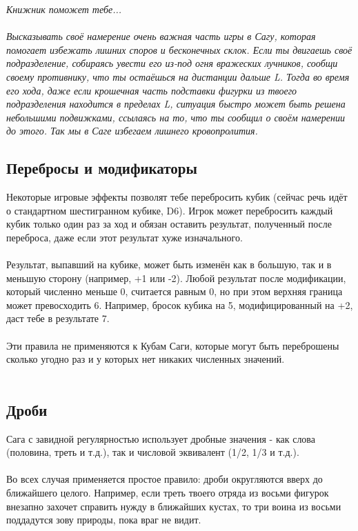 \documentclass[a4paper,11pt,twoside]{article}
\begin{document}
\begingroup
\fontsize{15pt}{11pt}\selectfont
\textit{Книжник поможет тебе...}\\ \\
\fontsize{11pt}{11pt}\selectfont
\textit{Высказывать своё намерение очень важная часть игры в Сагу, которая помогает избежать лишних споров и бесконечных склок. Если ты двигаешь своё подразделение, собираясь увести его из-под огня вражеских лучников, сообщи своему противнику, что ты остаёшься на дистанции дальше L. Тогда во время его хода, даже если крошечная часть подставки фигурки из твоего подразделения находится в пределах L, ситуация быстро может быть решена небольшими подвижками, ссылаясь на то, что ты сообщил о своём намерении до этого. Так мы в Саге избегаем лишнего кровопролития.}
\endgroup 

\subsection*{Перебросы и модификаторы}

Некоторые игровые эффекты позволят тебе перебросить кубик (сейчас речь идёт о стандартном шестигранном кубике, D6). Игрок может перебросить каждый кубик только один раз за ход и обязан оставить результат, полученный после переброса, даже если этот результат хуже изначального. \\ \\ 
Результат, выпавший на кубике, может быть изменён как в большую, так и в меньшую сторону (например, +1 или -2). Любой результат после модификации, который численно меньше 0, считается равным 0, но при этом верхняя граница может превосходить 6. Например, бросок кубика на 5, модифицированный на +2, даст тебе в результате 7. \\ \\ 
Эти правила не применяются к Кубам Саги, которые могут быть переброшены сколько угодно раз и у которых нет никаких численных значений. \\ \\ 

\subsection*{Дроби}

Сага с завидной регулярностью использует дробные значения - как слова (половина, треть и т.д.), так и числовой эквивалент (1/2, 1/3 и т.д.). \\ \\ 
Во всех случая применяется простое правило: дроби округляются вверх до ближайшего целого. Например, если треть твоего отряда из восьми фигурок внезапно захочет справить нужду в ближайших кустах, то три воина из восьми поддадутся зову природы, пока враг не видит. \\ \\ 
\end{document}
